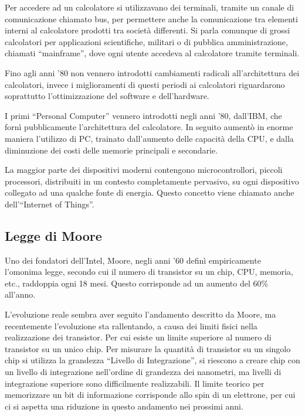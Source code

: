 \documentclass{article}
\numberwithin{equation}{subsection}
\begin{document}
Per accedere ad un calcolatore si utilizzavano dei terminali, tramite un canale di comunicazione chiamato bus, per permettere anche la comunicazione tra elementi interni al 
calcolatore prodotti tra società differenti. 
Si parla comunque di grossi calcolatori per applicazioni scientifiche, militari o di pubblica amministrazione, chiamati ``mainframe'', dove ogni utente accedeva al calcolatore 
tramite terminali. 

Fino agli anni '80 non vennero introdotti cambiamenti radicali all'architettura dei calcolatori, invece i miglioramenti di questi periodi ai calcolatori riguardarono soprattutto 
l'ottimizzazione del software e dell'hardware. 

I primi ``Personal Computer'' vennero introdotti negli anni '80, dall'IBM, che fornì pubblicamente l'architettura del calcolatore. In seguito aumentò in enorme maniera 
l'utilizzo di PC, trainato dall'aumento delle capacità della CPU, e dalla diminuzione dei costi delle memorie principali e secondarie. 



La maggior parte dei dispositivi moderni contengono microcontrollori, piccoli processori, distribuiti in un contesto completamente pervasivo, su ogni dispositivo collegato 
ad una qualche fonte di energia. Questo concetto viene chiamato anche dell'``Internet of Things''.  

\subsection{Legge di Moore}

Uno dei fondatori dell'Intel, Moore, negli anni '60 definì empiricamente l'omonima legge, secondo cui il numero di transistor su un chip, CPU, memoria, etc., raddoppia ogni 18 
mesi. Questo corrisponde ad un aumento del 60\% all'anno. 

L'evoluzione reale sembra aver seguito l'andamento descritto da Moore, ma recentemente l'evoluzione sta rallentando, a causa dei limiti fisici nella 
realizzazione dei transistor. Per cui esiste un limite superiore al numero di transistor su un unico chip. 
Per misurare la quantità di transistor su un singolo chip si utilizza la grandezza ``Livello di Integrazione'', si riescono a creare chip con un livello di 
integrazione nell'ordine di grandezza dei nanometri, ma livelli di integrazione superiore sono difficilmente realizzabili. Il limite teorico per memorizzare un bit di informazione 
corrisponde allo spin di un elettrone, per cui ci si aspetta una riduzione in questo andamento nei prossimi anni. 
\end{document}
